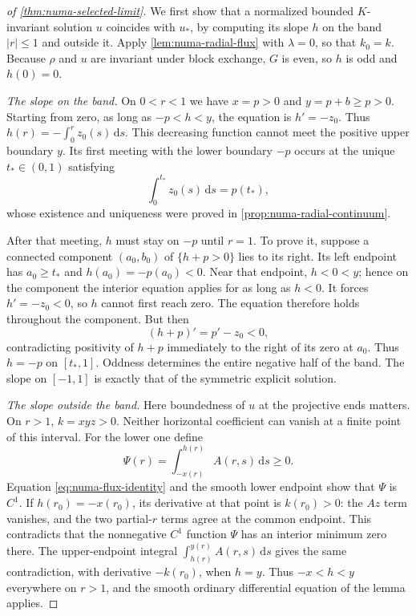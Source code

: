 \begin{proof}[of \cref{thm:numa-selected-limit}]
We first show that a normalized bounded $K$-invariant solution $u$ coincides with $u_*$, by computing its slope $h$ on the band $|r|\leq1$ and outside it. Apply \cref{lem:numa-radial-flux} with $\lambda=0$, so that $k_0=k$. Because $\rho$ and $u$ are invariant under block exchange, $G$ is even, so $h$ is odd and $h(0)=0$.

\emph{The slope on the band.} On $0<r<1$ we have $x=p>0$ and $y=p+b\geq p>0$. Starting from zero, as long as $-p<h<y$, the equation is $h'=-z_0$. Thus $h(r)=-\int_0^r z_0(s)\,\mathrm{d}s$. This decreasing function cannot meet the positive upper boundary $y$. Its first meeting with the lower boundary $-p$ occurs at the unique $t_*\in(0,1)$ satisfying
\[
 \int_0^{t_*}z_0(s)\,\mathrm{d}s=p(t_*),
\]
whose existence and uniqueness were proved in \cref{prop:numa-radial-continuum}.

After that meeting, $h$ must stay on $-p$ until $r=1$. To prove it, suppose a connected component $(a_0,b_0)$ of $\{h+p>0\}$ lies to its right. Its left endpoint has $a_0\geq t_*$ and $h(a_0)=-p(a_0)<0$. Near that endpoint, $h<0<y$; hence on the component the interior equation applies for as long as $h<0$. It forces $h'=-z_0<0$, so $h$ cannot first reach zero. The equation therefore holds throughout the component. But then
\[
 (h+p)'=p'-z_0<0,
\]
contradicting positivity of $h+p$ immediately to the right of its zero at $a_0$. Thus $h=-p$ on $[t_*,1]$. Oddness determines the entire negative half of the band. The slope on $[-1,1]$ is exactly that of the symmetric explicit solution.

\emph{The slope outside the band.} Here boundedness of $u$ at the projective ends matters. On $r>1$, $k=xyz>0$. Neither horizontal coefficient can vanish at a finite point of this interval. For the lower one define
\[
 \Psi(r)=\int_{-x(r)}^{h(r)}A(r,s)\,\mathrm{d}s\geq0.
\]
Equation \eqref{eq:numa-flux-identity} and the smooth lower endpoint show that $\Psi$ is $C^1$. If $h(r_0)=-x(r_0)$, its derivative at that point is $k(r_0)>0$: the $Az$ term vanishes, and the two partial-$r$ terms agree at the common endpoint. This contradicts that the nonnegative $C^1$ function $\Psi$ has an interior minimum zero there. The upper-endpoint integral $\int_{h(r)}^{y(r)}A(r,s)\,\mathrm{d}s$ gives the same contradiction, with derivative $-k(r_0)$, when $h=y$. Thus $-x<h<y$ everywhere on $r>1$, and the smooth ordinary differential equation of the lemma applies.


\end{proof}
